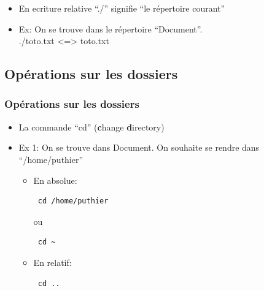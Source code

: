 \documentclass[10pt, xcolor=dvipsnames]{beamer}
\begin{document}
\begin{frame}[fragile]

        \begin{itemize}
            \item  En ecriture relative ``./'' signifie ``le répertoire courant''
            \item  Ex: On se trouve dans le répertoire ``Document''.\\
              ./toto.txt <=> toto.txt \\
        \end{itemize}

\end{frame}

\subsection{Opérations sur les dossiers}

\begin{frame}[fragile]
    \frametitle{Opérations sur les dossiers}
        \begin{itemize}
            \item  La commande ``cd'' (\textbf{c}hange \textbf{d}irectory)
            \item  Ex 1: On se trouve dans Document. On souhaite se rendre dans ``/home/puthier''\\
			\begin{itemize}
				\item En absolue: \\

              \begin{verbatim} cd /home/puthier \end{verbatim}
              ou 
              \begin{verbatim} cd ~ \end{verbatim}
              \item En relatif: \\
              \begin{verbatim} cd .. \end{verbatim}
        \end{itemize}
        \end{itemize}
\end{frame}
\end{document}
